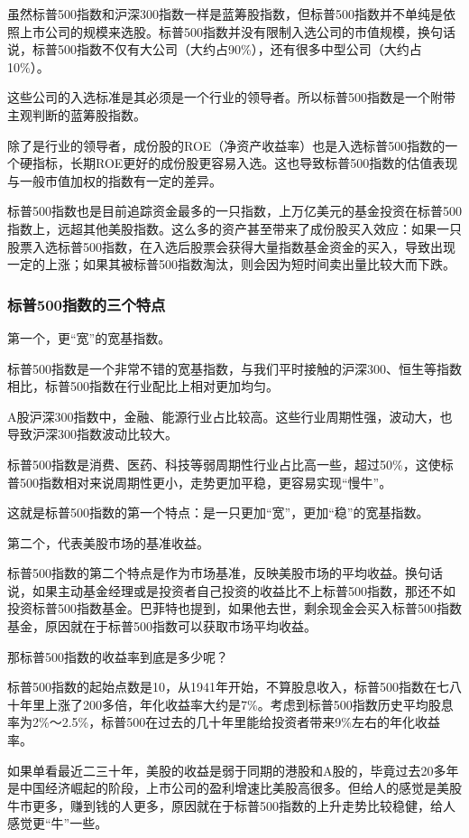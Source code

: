 虽然标普500指数和沪深300指数一样是蓝筹股指数，但标普500指数并不单纯是依照上市公司的规模来选股。标普500指数并没有限制入选公司的市值规模，换句话说，标普500指数不仅有大公司（大约占90\%），还有很多中型公司（大约占10\%）。

这些公司的入选标准是其必须是一个行业的领导者。所以标普500指数是一个附带主观判断的蓝筹股指数。

除了是行业的领导者，成份股的ROE（净资产收益率）也是入选标普500指数的一个硬指标，长期ROE更好的成份股更容易入选。这也导致标普500指数的估值表现与一般市值加权的指数有一定的差异。

标普500指数也是目前追踪资金最多的一只指数，上万亿美元的基金投资在标普500指数上，远超其他美股指数。这么多的资产甚至带来了成份股买入效应：如果一只股票入选标普500指数，在入选后股票会获得大量指数基金资金的买入，导致出现一定的上涨；如果其被标普500指数淘汰，则会因为短时间卖出量比较大而下跌。

\subsubsection{标普500指数的三个特点}

第一个，更“宽”的宽基指数。

标普500指数是一个非常不错的宽基指数，与我们平时接触的沪深300、恒生等指数相比，标普500指数在行业配比上相对更加均匀。

A股沪深300指数中，金融、能源行业占比较高。这些行业周期性强，波动大，也导致沪深300指数波动比较大。

标普500指数是消费、医药、科技等弱周期性行业占比高一些，超过50\%，这使标普500指数相对来说周期性更小，走势更加平稳，更容易实现“慢牛”。

这就是标普500指数的第一个特点：是一只更加“宽”，更加“稳”的宽基指数。

第二个，代表美股市场的基准收益。

标普500指数的第二个特点是作为市场基准，反映美股市场的平均收益。换句话说，如果主动基金经理或是投资者自己投资的收益比不上标普500指数，那还不如投资标普500指数基金。巴菲特也提到，如果他去世，剩余现金会买入标普500指数基金，原因就在于标普500指数可以获取市场平均收益。

那标普500指数的收益率到底是多少呢？

标普500指数的起始点数是10，从1941年开始，不算股息收入，标普500指数在七八十年里上涨了200多倍，年化收益率大约是7\%。考虑到标普500指数历史平均股息率为2\%～2.5\%，标普500在过去的几十年里能给投资者带来9\%左右的年化收益率。

如果单看最近二三十年，美股的收益是弱于同期的港股和A股的，毕竟过去20多年是中国经济崛起的阶段，上市公司的盈利增速比美股高很多。但给人的感觉是美股牛市更多，赚到钱的人更多，原因就在于标普500指数的上升走势比较稳健，给人感觉更“牛”一些。

